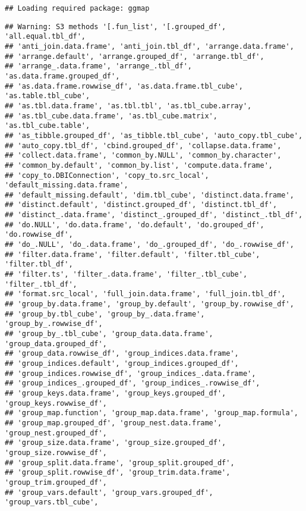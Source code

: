 \documentclass[]{article}
\begin{document}
\begin{verbatim}
## Loading required package: ggmap
\end{verbatim}

\begin{verbatim}
## Warning: S3 methods '[.fun_list', '[.grouped_df', 'all.equal.tbl_df',
## 'anti_join.data.frame', 'anti_join.tbl_df', 'arrange.data.frame',
## 'arrange.default', 'arrange.grouped_df', 'arrange.tbl_df',
## 'arrange_.data.frame', 'arrange_.tbl_df', 'as.data.frame.grouped_df',
## 'as.data.frame.rowwise_df', 'as.data.frame.tbl_cube', 'as.table.tbl_cube',
## 'as.tbl.data.frame', 'as.tbl.tbl', 'as.tbl_cube.array',
## 'as.tbl_cube.data.frame', 'as.tbl_cube.matrix', 'as.tbl_cube.table',
## 'as_tibble.grouped_df', 'as_tibble.tbl_cube', 'auto_copy.tbl_cube',
## 'auto_copy.tbl_df', 'cbind.grouped_df', 'collapse.data.frame',
## 'collect.data.frame', 'common_by.NULL', 'common_by.character',
## 'common_by.default', 'common_by.list', 'compute.data.frame',
## 'copy_to.DBIConnection', 'copy_to.src_local', 'default_missing.data.frame',
## 'default_missing.default', 'dim.tbl_cube', 'distinct.data.frame',
## 'distinct.default', 'distinct.grouped_df', 'distinct.tbl_df',
## 'distinct_.data.frame', 'distinct_.grouped_df', 'distinct_.tbl_df',
## 'do.NULL', 'do.data.frame', 'do.default', 'do.grouped_df', 'do.rowwise_df',
## 'do_.NULL', 'do_.data.frame', 'do_.grouped_df', 'do_.rowwise_df',
## 'filter.data.frame', 'filter.default', 'filter.tbl_cube', 'filter.tbl_df',
## 'filter.ts', 'filter_.data.frame', 'filter_.tbl_cube', 'filter_.tbl_df',
## 'format.src_local', 'full_join.data.frame', 'full_join.tbl_df',
## 'group_by.data.frame', 'group_by.default', 'group_by.rowwise_df',
## 'group_by.tbl_cube', 'group_by_.data.frame', 'group_by_.rowwise_df',
## 'group_by_.tbl_cube', 'group_data.data.frame', 'group_data.grouped_df',
## 'group_data.rowwise_df', 'group_indices.data.frame',
## 'group_indices.default', 'group_indices.grouped_df',
## 'group_indices.rowwise_df', 'group_indices_.data.frame',
## 'group_indices_.grouped_df', 'group_indices_.rowwise_df',
## 'group_keys.data.frame', 'group_keys.grouped_df', 'group_keys.rowwise_df',
## 'group_map.function', 'group_map.data.frame', 'group_map.formula',
## 'group_map.grouped_df', 'group_nest.data.frame', 'group_nest.grouped_df',
## 'group_size.data.frame', 'group_size.grouped_df', 'group_size.rowwise_df',
## 'group_split.data.frame', 'group_split.grouped_df',
## 'group_split.rowwise_df', 'group_trim.data.frame', 'group_trim.grouped_df',
## 'group_vars.default', 'group_vars.grouped_df', 'group_vars.tbl_cube',

\end{verbatim}
\end{document}
